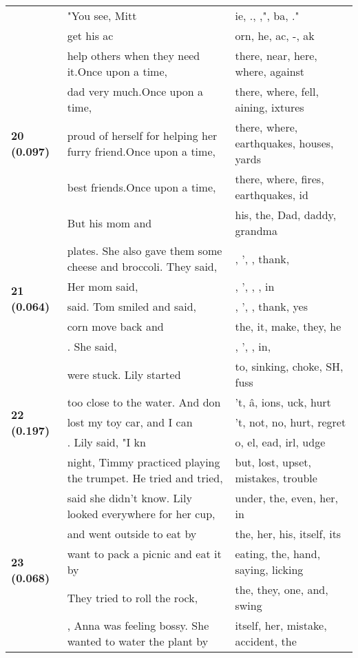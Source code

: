 \documentclass{article}
\begin{document}
\begin{adjustbox}{max width=\textwidth}
\begin{tabular}{p{} p{} p{}}
 & "You see, Mitt & ie, ., ,", ba, ." \\
 & get his ac & orn, he,  ac, -, ak \\
\midrule
\multirow{5}{*}{\textbf{20 (0.097)}} & help others when they need it.Once upon a time, & there,  near,  here,  where,  against \\
 & dad very much.Once upon a time, & there,  where,  fell, aining, ixtures \\
 & proud of herself for helping her furry friend.Once upon a time, & there,  where,  earthquakes,  houses,  yards \\
 & best friends.Once upon a time, & there,  where,  fires,  earthquakes, id \\
 & But his mom and & his,  the,  Dad,  daddy,  grandma \\
\midrule
\multirow{5}{*}{\textbf{21 (0.064)}} & plates. She also gave them some cheese and broccoli. They said, & ,  ',  ,  thank, \\
 & Her mom said, & ,  ',  ,  ,  in \\
 & said. Tom smiled and said, & ,  ',  ,  thank,  yes \\
 & corn move back and & the,  it,  make,  they,  he \\
 & . She said, & ,  ',  ,  in, \\
\midrule
\multirow{5}{*}{\textbf{22 (0.197)}} & were stuck. Lily started & to,  sinking,  choke,  SH,  fuss \\
 & too close to the water. And don & 't, â, ions, uck,  hurt \\
 & lost my toy car, and I can & 't,  not,  no,  hurt,  regret \\
 & .   Lily said, "I kn & o, el, ead, irl, udge \\
 & night, Timmy practiced playing the trumpet. He tried and tried, & but,  lost,  upset,  mistakes,  trouble \\
\midrule
\multirow{5}{*}{\textbf{23 (0.068)}} & said she didn't know.  Lily looked everywhere for her cup, & under,  the,  even,  her,  in \\
 & and went outside to eat by & the,  her,  his,  itself,  its \\
 & want to pack a picnic and eat it by & eating,  the,  hand,  saying,  licking \\
 & They tried to roll the rock, & the,  they,  one,  and,  swing \\
 & , Anna was feeling bossy. She wanted to water the plant by & itself,  her,  mistake,  accident,  the \\

\end{tabular}
\end{adjustbox}
\end{document}
